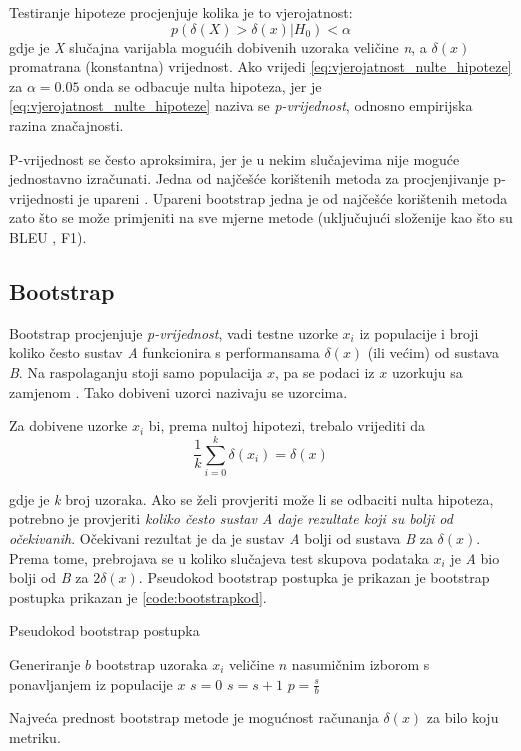Testiranje hipoteze procjenjuje kolika je to vjerojatnost:
\begin{equation}
\label{eq:vjerojatnost_nulte_hipoteze}
p(\delta(X) > \delta(x) | H_{0}) < \alpha
\end{equation}
gdje je \textit{X} slučajna varijabla mogućih dobivenih uzoraka veličine \textit{n}, a $\delta(x)$ promatrana (konstantna) vrijednost. Ako vrijedi \ref{eq:vjerojatnost_nulte_hipoteze} za $\alpha=0.05$ onda se odbacuje nulta hipoteza, jer je 
\ref{eq:vjerojatnost_nulte_hipoteze} naziva se \textit{p-vrijednost}, odnosno empirijska razina značajnosti. 

P-vrijednost se često aproksimira, jer je u nekim slučajevima nije moguće jednostavno izračunati. Jedna od najčešće korištenih metoda za procjenjivanje p-vrijednosti je upareni . Upareni bootstrap jedna je od najčešće korištenih metoda \citep{koehn2004statistical} zato što se može primjeniti na sve mjerne metode (uključujući složenije kao što su BLEU \citep{papineni2002bleu}, F1). 


\subsection{Bootstrap}

Bootstrap procjenjuje \textit{p-vrijednost}, vadi testne uzorke $x_i$ iz populacije i broji koliko često sustav \emph{A} funkcionira s performansama $\delta(x)$ (ili većim) od sustava \textit{B}. Na raspolaganju stoji samo populacija $x$, pa se podaci iz $x$ uzorkuju sa zamjenom . Tako dobiveni uzorci nazivaju se  uzorcima. 

Za dobivene uzorke $x_i$ bi, prema nultoj hipotezi, trebalo vrijediti da 
\begin{equation}
\label{eq:jednakost_delta}
\frac{1}{k}\sum_{i=0}^{k}\delta(x_i) = \delta(x)
\end{equation}

gdje je \textit{k} broj uzoraka. Ako se želi provjeriti može li se odbaciti nulta hipoteza, potrebno je provjeriti \textit{koliko često sustav A daje rezultate koji su bolji od očekivanih}. Očekivani rezultat je da je sustav \textit{A} bolji od sustava \textit{B} za $\delta(x)$. Prema tome, prebrojava se u koliko slučajeva test skupova podataka $x_i$ je \textit{A} bio bolji od \textit{B} za $2\delta(x)$. Pseudokod bootstrap postupka je prikazan je \citep{berg2012empirical} bootstrap postupka prikazan je \ref{code:bootstrapkod}.

\begin{algorithm}
\caption{Pseudokod bootstrap postupka}\label{code:bootstrapkod}
\begin{algorithmic}[1]
\State Generiranje $b$ bootstrap uzoraka $x_i$ veličine $n$ nasumičnim izborom s ponavljanjem iz populacije $x$
\State $s=0$
\Repeat 
{}
\State $s=s+1$
\EndIf
{}
\State $p=\frac{s}{b}$
\end{algorithmic}
\end{algorithm}

Najveća prednost bootstrap metode je mogućnost računanja $\delta(x)$ za bilo koju metriku. 

